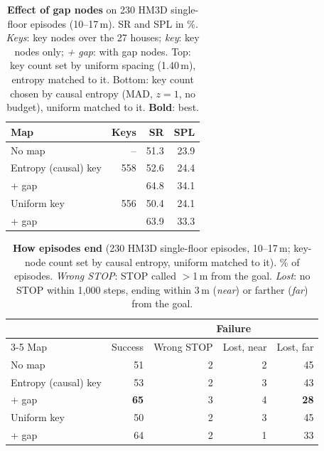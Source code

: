 \begin{table}[H]
\centering
\scriptsize
\setlength{\tabcolsep}{2pt}
\caption{\textbf{Effect of gap nodes} on 230 HM3D single-floor episodes (10--17\,m). SR and SPL in \%. \emph{Keys}: key nodes over the 27 houses; \emph{key}: key nodes only; \emph{+ gap}: with gap nodes. Top: key count set by uniform spacing (1.40\,m), entropy matched to it. Bottom: key count chosen by causal entropy (MAD, $z{=}1$, no budget), uniform matched to it. \textbf{Bold}: best.}
\label{tab:gap_nodes}
\begin{tabular}{@{}lrrr@{}}
\toprule
Map & Keys & SR & SPL \\
\midrule
No map                     & --    & 51.3 & 23.9 \\
Entropy (causal) key       & 558     & 52.6 & 24.4 \\
\quad + gap                &         & 64.8 & 34.1 \\
Uniform key                & 556     & 50.4 & 24.1 \\
\quad + gap                &         & 63.9 & 33.3 \\
\bottomrule
\end{tabular}
\end{table}

\begin{table}[H]
\centering
\scriptsize
\setlength{\tabcolsep}{2.5pt}
\caption{\textbf{How episodes end} (230 HM3D single-floor episodes, 10--17\,m; key-node count set by causal entropy, uniform matched to it). \% of episodes. \emph{Wrong STOP}: STOP called $>$1\,m from the goal. \emph{Lost}: no STOP within 1{,}000 steps, ending within 3\,m (\emph{near}) or farther (\emph{far}) from the goal.}
\label{tab:failures}
\begin{tabular}{@{}lrrrr@{}}
\toprule
& & \multicolumn{3}{c}{Failure} \\
\cmidrule(l){3-5}
Map & Success & Wrong STOP & Lost, near & Lost, far \\
\midrule
No map                 & 51 & 2 & 2 & 45 \\
\midrule
Entropy (causal) key   & 53 & 2 & 3 & 43 \\
\quad + gap            & \textbf{65} & 3 & 4 & \textbf{28} \\
\midrule
Uniform key            & 50 & 2 & 3 & 45 \\
\quad + gap            & 64 & 2 & 1 & 33 \\
\bottomrule
\end{tabular}
\end{table}
